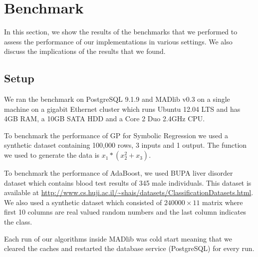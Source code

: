 
\section{Benchmark}
\label{sec:bench}
In this section, we show the results of the benchmarks that we performed to assess the performance of our implementations in various settings. We also discuss the implications of the results that we found.
\subsection{Setup}
We ran the benchmark on PostgreSQL 9.1.9 and MADlib v0.3 on a single machine on a gigabit Ethernet cluster which runs Ubuntu 12.04 LTS and has 4GB RAM, a 10GB SATA HDD and a Core 2 Duo 2.4GHz CPU. 

To benchmark the performance of GP for Symbolic Regression we used a synthetic dataset containing 100,000 rows, 3 inputs and 1 output. The function we used to generate the data is $x_1*(x_2^2+x_3)$.

To benchmark the performance of AdaBoost, we used BUPA liver disorder dataset which contains blood test results of 345 male individuals. This dataset is available at \url{http://www.cs.huji.ac.il/~shais/datasets/ClassificationDatasets.html}. We also used a synthetic dataset which consisted of $240000\times11$ matrix where first 10 columns are real valued random numbers and the last column indicates the class.

Each run of our algorithms inside MADlib was cold start meaning that we cleared the caches and restarted the database service (PostgreSQL) for every run.



